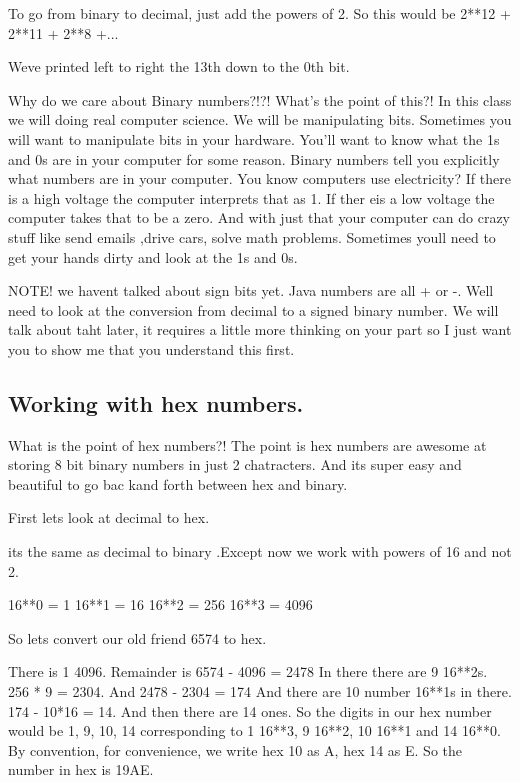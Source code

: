 \documentclass[10pt]{article}
\begin{document}
To go from binary to decimal, just add the powers of 2. 
So this would be 
2**12 + 2**11 + 2**8 +...

Weve printed left to right the 13th down to the 0th bit.

Why do we care about Binary numbers?!?! What's the point of this?! 
In this class we will doing real computer science. We will be manipulating bits.
Sometimes you will want to manipulate bits in your hardware. You'll want to know
what the 1s and 0s are in your computer for some reason. Binary numbers tell you
explicitly what numbers are in your computer. You know computers use
electricity? If there is a high voltage the computer interprets that as 1. If
ther eis a low voltage the computer takes that to be a zero. And with just that
your computer can do crazy stuff like send emails ,drive cars, solve math
problems. Sometimes youll need to get your hands dirty and look at the 1s and
0s.

NOTE! we havent talked about sign bits yet. Java numbers are all + or -. Well
need to look at the conversion from decimal to a signed binary number. We will
talk about taht later, it requires a little more thinking on your part so I just
want you to show me that you understand this first.

\subsection{Working with hex numbers.}

What is the point of hex numbers?! The point is hex numbers are awesome at
storing 8 bit  binary numbers in just 2 chatracters. And its super easy and
beautiful to go bac kand forth between hex and binary.

First lets look at decimal to hex.

its the same as decimal to binary .Except now we work with powers of 16 and not
2.

16**0 = 1
16**1 = 16
16**2 = 256
16**3 = 4096

So lets convert our old friend 6574 to hex.

There is 1 4096. Remainder is 6574 - 4096 = 2478
In there there are 9 16**2s. 256 * 9 = 2304. And 2478 - 2304 = 174
And there are 10 number 16**1s in there. 174 - 10*16 = 14.
And then there are 14 ones.
So the digits in our hex number would be 
1, 9, 10, 14 corresponding to 1 16**3, 9 16**2, 10 16**1 and 14 16**0.
By convention, for convenience, we write hex 10 as A, hex 14 as E.
So the number in hex is 19AE.
\end{document}
